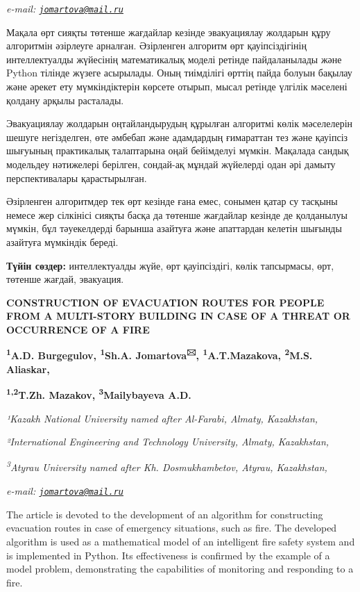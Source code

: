 \documentclass[
]{article}
\begin{document}
\emph{e-mail:
\href{mailto:jomartova@mail.ru}{\nolinkurl{jomartova@mail.ru}}}

Мақала өрт сияқты төтенше жағдайлар кезінде эвакуациялау жолдарын құру
алгоритмін әзірлеуге арналған. Әзірленген алгоритм өрт қауіпсіздігінің
интеллектуалды жүйесінің математикалық моделі ретінде пайдаланылады және
Python тілінде жүзеге асырылады. Оның тиімділігі өрттің пайда болуын
бақылау және әрекет ету мүмкіндіктерін көрсете отырып, мысал ретінде
үлгілік мәселені қолдану арқылы расталады.

Эвакуациялау жолдарын оңтайландырудың құрылған алгоритмі көлік
мәселелерін шешуге негізделген, өте әмбебап және адамдардың ғимараттан
тез және қауіпсіз шығуының практикалық талаптарына оңай бейімделуі
мүмкін. Мақалада сандық модельдеу нәтижелері берілген, сондай-ақ мұндай
жүйелерді одан әрі дамыту перспективалары қарастырылған.

Әзірленген алгоритмдер тек өрт кезінде ғана емес, сонымен қатар су
тасқыны немесе жер сілкінісі сияқты басқа да төтенше жағдайлар кезінде
де қолданылуы мүмкін, бұл тәуекелдерді барынша азайтуға және апаттардан
келетін шығынды азайтуға мүмкіндік береді.

\textbf{Түйін сөздер:} интеллектуалды жүйе, өрт қауіпсіздігі, көлік
тапсырмасы, өрт, төтенше жағдай, эвакуация.

\textbf{CONSTRUCTION OF EVACUATION ROUTES FOR PEOPLE FROM A MULTI-STORY
BUILDING IN CASE OF A THREAT OR OCCURRENCE OF A FIRE}

\textbf{\textsuperscript{1}A.D. Burgegulov, \textsuperscript{1}Sh.A.
Jomartova\textsuperscript{🖂}, \textsuperscript{1}A.T.Mazakova,
\textsuperscript{2}M.S. Aliaskar,}

\textbf{\textsuperscript{1,2}T.Zh. Mazakov,
\textsuperscript{3}Mailybayeva A.D.}

\emph{¹Kazakh National University named after Al-Farabi, Almaty,
Kazakhstan,}

\emph{²International Engineering and Technology University, Almaty,
Kazakhstan,}

\emph{\textsuperscript{3}Atyrau University named after Kh.
Dosmukhambetov, Atyrau, Kazakhstan,}

\emph{e-mail:
\href{mailto:jomartova@mail.ru}{\nolinkurl{jomartova@mail.ru}}}

The article is devoted to the development of an algorithm for
constructing evacuation routes in case of emergency situations, such as
fire. The developed algorithm is used as a mathematical model of an
intelligent fire safety system and is implemented in Python. Its
effectiveness is confirmed by the example of a model problem,
demonstrating the capabilities of monitoring and responding to a fire.
\end{document}
